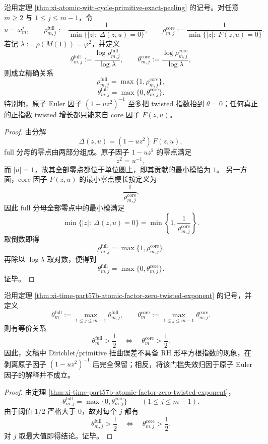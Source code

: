 \begin{theorem}\label{thm:xi-time-part57b-atomic-factor-zero-twisted-exponent}
沿用定理 \ref{thm:xi-atomic-witt-cycle-primitive-exact-peeling} 的记号。对任意 \(m\ge 2\) 与 \(1\le j\le m-1\)，令
\[
u=\omega_m^j,\qquad
\rho_{m,j}^{\mathrm{full}}
:=
\frac{1}{\min\{|z|:\ \Delta(z,u)=0\}},
\qquad
\rho_{m,j}^{\mathrm{core}}
:=
\frac{1}{\min\{|z|:\ F(z,u)=0\}}.
\]
若记 \(\lambda:=\rho(M(1))=\varphi^2\)，并定义
\[
\theta_{m,j}^{\mathrm{full}}
:=
\frac{\log \rho_{m,j}^{\mathrm{full}}}{\log\lambda},
\qquad
\theta_{m,j}^{\mathrm{core}}
:=
\frac{\log \rho_{m,j}^{\mathrm{core}}}{\log\lambda},
\]
则成立精确关系
\[
\boxed{\;
\rho_{m,j}^{\mathrm{full}}=\max\{1,\rho_{m,j}^{\mathrm{core}}\},\;}
\]
\[
\boxed{\;
\theta_{m,j}^{\mathrm{full}}=\max\{0,\theta_{m,j}^{\mathrm{core}}\}.\;}
\]
特别地，原子 Euler 因子 \((1-uz^2)^{-1}\) 至多把 twisted 指数抬到 \(\theta=0\)；任何真正的正指数 twisted 增长都只能来自 core 因子 \(F(z,u)\)。
\end{theorem}
\begin{proof}
由分解
\[
\Delta(z,u)=(1-uz^2)\,F(z,u),
\]
full 分母的零点由两部分组成。原子因子 \(1-uz^2\) 的零点满足
\[
z^2=u^{-1},
\]
而 \(|u|=1\)，故其全部零点都位于单位圆上，即其贡献的最小模恰为 \(1\)。
另一方面，core 因子 \(F(z,u)\) 的最小零点模长按定义为
\[
\frac{1}{\rho_{m,j}^{\mathrm{core}}}.
\]
因此 full 分母全部零点中的最小模满足
\[
\min\{|z|:\ \Delta(z,u)=0\}
=
\min\left\{1,\frac{1}{\rho_{m,j}^{\mathrm{core}}}\right\}.
\]
取倒数即得
\[
\rho_{m,j}^{\mathrm{full}}=\max\{1,\rho_{m,j}^{\mathrm{core}}\}.
\]
再除以 \(\log\lambda\) 取对数，便得到
\[
\theta_{m,j}^{\mathrm{full}}=\max\{0,\theta_{m,j}^{\mathrm{core}}\}.
\]
证毕。
\end{proof}

\begin{corollary}\label{cor:xi-time-part57b-core-full-square-root-barrier-equivalence}
沿用定理 \ref{thm:xi-time-part57b-atomic-factor-zero-twisted-exponent} 的记号，并定义
\[
\theta_m^{\mathrm{full}}
:=
\max_{1\le j\le m-1}\theta_{m,j}^{\mathrm{full}},
\qquad
\theta_m^{\mathrm{core}}
:=
\max_{1\le j\le m-1}\theta_{m,j}^{\mathrm{core}}.
\]
则有等价关系
\[
\boxed{\;
\theta_m^{\mathrm{full}}>\frac12
\quad\Longleftrightarrow\quad
\theta_m^{\mathrm{core}}>\frac12.\;}
\]
因此，文稿中 Dirichlet/primitive 扭曲误差不具备 RH 形平方根指数的现象，在剥离原子因子 \((1-uz^2)^{-1}\) 后完全保留；相反，将该门槛失效归因于原子 Euler 因子的解释并不成立。
\end{corollary}
\begin{proof}
由定理 \ref{thm:xi-time-part57b-atomic-factor-zero-twisted-exponent}，
\[
\theta_{m,j}^{\mathrm{full}}=\max\{0,\theta_{m,j}^{\mathrm{core}}\}
\qquad(1\le j\le m-1).
\]
由于阈值 \(1/2\) 严格大于 \(0\)，故对每个 \(j\) 都有
\[
\theta_{m,j}^{\mathrm{full}}>\frac12
\quad\Longleftrightarrow\quad
\theta_{m,j}^{\mathrm{core}}>\frac12.
\]
对 \(j\) 取最大值即得结论。证毕。
\end{proof}


